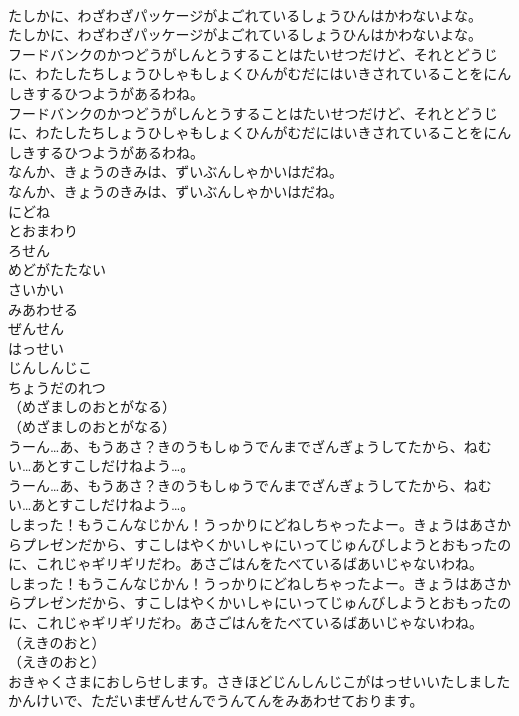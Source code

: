 \documentclass[8pt]{extreport}
\begin{document}
\begin{CJK}{UTF8}{min}
\\	たしかに、わざわざパッケージがよごれているしょうひんはかわないよな。	
\\	たしかに、わざわざパッケージがよごれているしょうひんはかわないよな。 
\\	フードバンクのかつどうがしんとうすることはたいせつだけど、それとどうじに、わたしたちしょうひしゃもしょくひんがむだにはいきされていることをにんしきするひつようがあるわね。	
\\	フードバンクのかつどうがしんとうすることはたいせつだけど、それとどうじに、わたしたちしょうひしゃもしょくひんがむだにはいきされていることをにんしきするひつようがあるわね。 
\\	なんか、きょうのきみは、ずいぶんしゃかいはだね。	
\\	なんか、きょうのきみは、ずいぶんしゃかいはだね。 
\\	にどね
\\	とおまわり
\\	ろせん
\\	めどがたたない
\\	さいかい
\\	みあわせる
\\	ぜんせん
\\	はっせい
\\	じんしんじこ
\\	ちょうだのれつ
\\	（めざましのおとがなる）	
\\	（めざましのおとがなる） 
\\	うーん…あ、もうあさ？きのうもしゅうでんまでざんぎょうしてたから、ねむい…あとすこしだけねよう…。	
\\	うーん…あ、もうあさ？きのうもしゅうでんまでざんぎょうしてたから、ねむい…あとすこしだけねよう…。 
\\	しまった！もうこんなじかん！うっかりにどねしちゃったよー。きょうはあさからプレゼンだから、すこしはやくかいしゃにいってじゅんびしようとおもったのに、これじゃギリギリだわ。あさごはんをたべているばあいじゃないわね。	
\\	しまった！もうこんなじかん！うっかりにどねしちゃったよー。きょうはあさからプレゼンだから、すこしはやくかいしゃにいってじゅんびしようとおもったのに、これじゃギリギリだわ。あさごはんをたべているばあいじゃないわね。 
\\	（えきのおと）	
\\	（えきのおと） 
\\	おきゃくさまにおしらせします。さきほどじんしんじこがはっせいいたしましたかんけいで、ただいまぜんせんでうんてんをみあわせております。	

\end{CJK}
\end{document}
